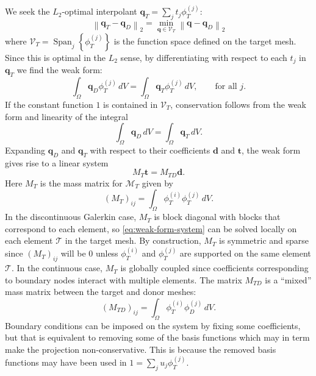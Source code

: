 We seek the \(L_2\)-optimal interpolant \(\bm{q}_T = \sum_j t_j \phi_T^{(j)}\):
\begin{equation}
\left \lVert \bm{q}_T - \bm{q}_D \right \rVert_2 =
\min_{\bm{q} \in \mathcal{V}_T}
\left \lVert \bm{q} - \bm{q}_D \right \rVert_2
\end{equation}
where \(\mathcal{V}_T = \operatorname{Span}_j\left\{\phi_T^{(j)}\right\}\)
is the function space defined on the target mesh. Since this is optimal in
the \(L_2\) sense, by differentiating with respect to each \(t_j\) in
\(\bm{q}_T\) we find the weak form:
\begin{equation}
\int_{\Omega} \bm{q}_D \phi_T^{(j)} \, dV =
  \int_{\Omega} \bm{q}_T \phi_T^{(j)} \, dV, \qquad \text{for all } j.
\end{equation}
If the constant function \(1\) is contained in \(\mathcal{V}_T\),
conservation follows from the weak form and linearity of the integral
\begin{equation}
\int_{\Omega} \bm{q}_D \, dV =
  \int_{\Omega} \bm{q}_T \, dV.
\end{equation}
Expanding \(\bm{q}_D\) and \(\bm{q}_T\) with respect to their coefficients
\(\bm{d}\) and \(\bm{t}\), the weak form gives rise to a linear system
\begin{equation}\label{eq:weak-form-system}
M_T \bm{t} = M_{TD} \bm{d}.
\end{equation}
Here \(M_T\) is the mass matrix for
\(\mathcal{M}_T\) given by
\begin{equation}
\left(M_T\right)_{ij} = \int_{\Omega} \phi_T^{(i)} \phi_T^{(j)} \, dV.
\end{equation}
In the discontinuous Galerkin case, \(M_T\) is block diagonal with blocks
that correspond to each element, so \eqref{eq:weak-form-system} can be
solved locally on each element \(\mathcal{T}\) in the target mesh. By
construction, \(M_T\) is symmetric and sparse since \(\left(M_T\right)_{ij}\)
will be \(0\) unless \(\phi_T^{(i)}\) and \(\phi_T^{(j)}\) are supported
on the same element \(\mathcal{T}\). In the continuous case, \(M_T\) is
globally coupled since coefficients corresponding to boundary nodes interact
with multiple elements. The matrix \(M_{TD}\) is a ``mixed'' mass matrix
between the target and donor meshes:
\begin{equation}
\left(M_{TD}\right)_{ij} = \int_{\Omega} \phi_T^{(i)} \phi_D^{(j)} \, dV.
\end{equation}
Boundary conditions can be imposed on the system by fixing some coefficients,
but that is equivalent to removing some of the basis functions which may
in term make the projection non-conservative. This is because the removed
basis functions may have been used in \(1 = \sum_j u_j \phi_{T}^{(j)}\).

